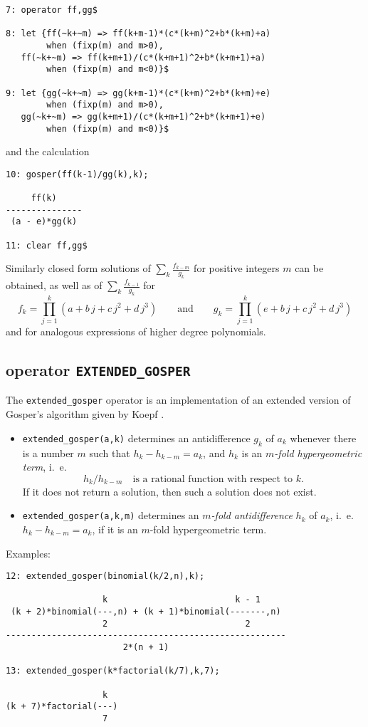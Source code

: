 {\small
\begin{verbatim}
7: operator ff,gg$

8: let {ff(~k+~m) => ff(k+m-1)*(c*(k+m)^2+b*(k+m)+a) 
        when (fixp(m) and m>0),
   ff(~k+~m) => ff(k+m+1)/(c*(k+m+1)^2+b*(k+m+1)+a) 
        when (fixp(m) and m<0)}$

9: let {gg(~k+~m) => gg(k+m-1)*(c*(k+m)^2+b*(k+m)+e) 
        when (fixp(m) and m>0),
   gg(~k+~m) => gg(k+m+1)/(c*(k+m+1)^2+b*(k+m+1)+e) 
        when (fixp(m) and m<0)}$
\end{verbatim}
}\noindent
and the calculation

{\small
\begin{verbatim}
10: gosper(ff(k-1)/gg(k),k);

     ff(k)
---------------
 (a - e)*gg(k)

11: clear ff,gg$
\end{verbatim}
}\noindent
Similarly closed form solutions of $\sum\nolimits_k\frac{f_{k-m}}{g_{k}}$
for positive integers $m$ can be obtained, as well as of
$\sum_k\frac{f_{k-1}}{g_{k}}$ for
\[
f_k=\prod_{j=1}^k (a+b\,j+c\,j^2+d\,j^3)
\quad\quad\mbox{and}\quad\quad
g_k=\prod_{j=1}^k (e+b\,j+c\,j^2+d\,j^3)
\]
and for analogous expressions of higher degree polynomials.

\subsection{\REDUCE{} operator {\tt EXTENDED\_GOSPER}}
The {\tt extended\_gosper} operator is an implementation of an extended
version of Gosper's algorithm given by Koepf \cite{Koepf}.
\begin{itemize}
\item
{\tt extended\_gosper(a,k)} determines an antidifference $g_k$ of $a_k$
whenever there is a number $m$ such that $h_{k}-h_{k-m}=a_k$, and $h_k$ is an
{\sl $m$-fold hypergeometric term}, i.\ e.
\[
h_{k}/h_{k-m}\quad\mbox{is a rational function with respect to $k$.}
\]
If it does not return a solution, then such a solution does not exist.
\item
{\tt extended\_gosper(a,k,m)} 
determines an {\sl $m$-fold antidifference} $h_k$ of $a_k$,
i.\ e.\ $h_{k}-h_{k-m}=a_k$, if it is an $m$-fold hypergeometric term.
\end{itemize}
Examples:

{\small
\begin{verbatim}
12: extended_gosper(binomial(k/2,n),k);

                   k                         k - 1
 (k + 2)*binomial(---,n) + (k + 1)*binomial(-------,n)
                   2                           2
-------------------------------------------------------
                       2*(n + 1)

13: extended_gosper(k*factorial(k/7),k,7);

                   k
(k + 7)*factorial(---)
                   7
\end{verbatim}
}\noindent

